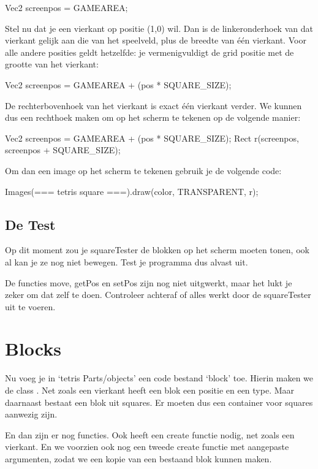 \begin{code}
Vec2 screenpos = GAMEAREA;
\end{code}

Stel nu dat je een vierkant op positie (1,0) wil. Dan is de linkeronderhoek van dat vierkant gelijk aan die van het speelveld, plus de breedte van \'e\'en vierkant. Voor alle andere posities geldt hetzelfde: je vermenigvuldigt de grid positie met de grootte van het vierkant:

\begin{code}
Vec2 screenpos = GAMEAREA + (pos * SQUARE_SIZE);
\end{code}

De rechterbovenhoek van het vierkant is exact \'e\'en vierkant verder. We kunnen dus een rechthoek maken om op het scherm te tekenen op de volgende manier:

\begin{code}
Vec2 screenpos = GAMEAREA + (pos * SQUARE_SIZE);
Rect r(screenpos, screenpos + SQUARE_SIZE);
\end{code}

Om dan een image op het scherm te tekenen gebruik je de volgende code: 

\begin{code}
Images(=== tetris square ===).draw(color, TRANSPARENT, r);
\end{code}

\subsection{De Test}
Op dit moment zou je squareTester de blokken op het scherm moeten tonen, ook al kan je ze nog niet bewegen. Test je programma dus alvast uit.

De functies move, getPos en setPos zijn nog niet uitgwerkt, maar het lukt je zeker om dat zelf te doen. Controleer achteraf of alles werkt door de squareTester uit te voeren.

\section{Blocks}
Nu voeg je in `tetris Parts/objects' een code bestand `block' toe. Hierin maken we de class . Net zoals een vierkant heeft een blok een positie en een type. Maar daarnaast bestaat een blok uit squares. Er moeten dus een container voor squares aanwezig zijn.

En dan zijn er nog functies. Ook  heeft een create functie nodig, net zoals een vierkant. En we voorzien ook nog een tweede create functie met aangepaste argumenten, zodat we een kopie van een bestaand blok kunnen maken.

